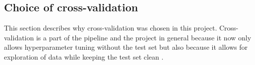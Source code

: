 \subsection{Choice of cross-validation}

This section describes why cross-validation was chosen in this project. Cross-validation is a part of the pipeline and the project in general because it now only allows hyperparameter tuning without the test set but also because it allows for exploration of data while keeping the test set clean \cite{james-statistical-learning}.
